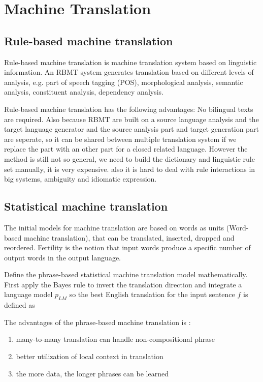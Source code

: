 \chapter{Machine Translation}
\section{Rule-based machine translation}


Rule-based machine translation is machine translation system based on linguistic information. An RBMT system generates translation based on different levels of analysis, e.g. part of speech tagging (POS), morphological analysis,  semantic analysis, constituent analysis, dependency analysis.

Rule-based machine translation has the following advantages: No bilingual texts are required. Also because RBMT are built on a source language analysis and the target language generator and the source analysis part and target generation part are seperate, so it can be shared between multiple translation system if we replace the part with an other part for a closed related language.
However the method is still not so general, we need to build the dictionary and  linguistic rule set manually, it is very expensive. also it is hard to deal with rule interactions in big systems, ambiguity and idiomatic expression.




\section{Statistical machine translation}
The initial models for machine translation are based on words as units (Word-based machine translation), that can be translated, inserted, dropped and reordered.
Fertility is the notion that input words produce a specific number of output words in the output language.

Define the phrase-based statistical machine translation model mathematically.  First apply the Bayes rule to invert the translation direction and integrate a language model $p_{LM}$ so the best English translation for the input sentence ${f} $ is defined as 

The advantages of the phrase-based machine translation is :
\begin{enumerate}
	\item many-to-many translation can handle non-compositional phrase	
	\item better utilization of local context in translation
	\item the more data, the longer phrases can be learned 
\end{enumerate}

